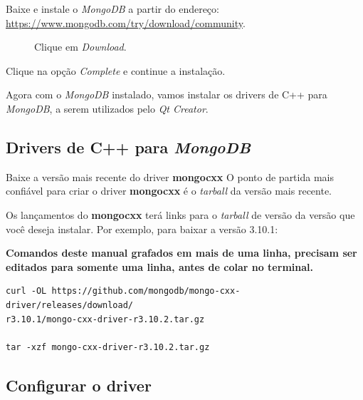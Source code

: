 \documentclass[a4paper,11pt]{article}
\newcommand{\qtcreator}{\textit{Qt Creator}}
\newcommand{\download}{\textit{Download}}
\newcommand{\mongo}{\textit{MongoDB}}
\newcommand{\cautionbox}[1]{
	\vskip 5mm
	\begin{leftbar}
		\textbf{#1}
	\end{leftbar}
	\vskip 5mm
}
\begin{document}
Baixe e instale o \mongo{} a partir do endereço: \url{https://www.mongodb.com/try/download/community}.

\begin{figure}[H]
	\centering
	\caption{Clique em \download{}.}\label{fig:mongodb_download_2}
\end{figure}

Clique na opção \textit{Complete} e continue a instalação.

Agora com o \mongo{} instalado, vamos instalar os drivers de C++ para \mongo{}, a serem utilizados pelo \qtcreator{}.


\subsection*{Drivers de C++ para \mongo{}}

Baixe a versão mais recente do driver \textbf{mongocxx}
O ponto de partida mais confiável para criar o driver \textbf{mongocxx} é o \textit{tarball} da versão mais recente.

Os lançamentos do \textbf{mongocxx} terá links para o \textit{tarball} de versão da versão que você deseja instalar. Por exemplo, para baixar a versão 3.10.1:

\newpage

\cautionbox{\color{orange}Comandos deste manual grafados em mais de uma linha, precisam ser editados para somente uma linha, antes de colar no terminal.}

\begin{mdframed}
	\begin{verbatim}
curl -OL https://github.com/mongodb/mongo-cxx-driver/releases/download/
r3.10.1/mongo-cxx-driver-r3.10.2.tar.gz

tar -xzf mongo-cxx-driver-r3.10.2.tar.gz
	\end{verbatim}
\end{mdframed}

\subsection*{Configurar o driver}
\end{document}
